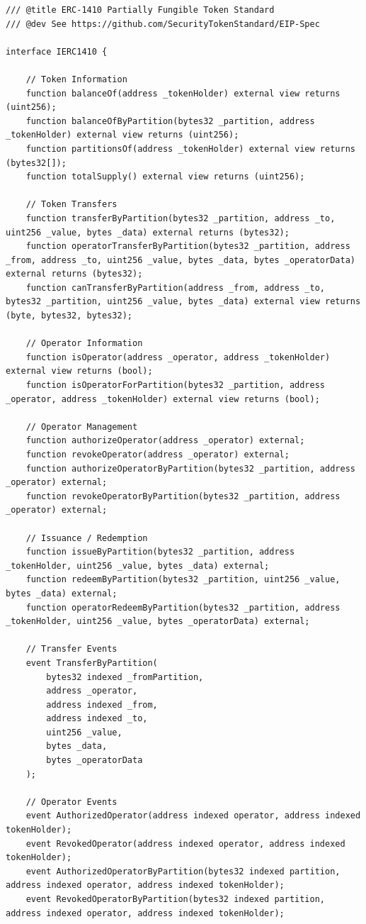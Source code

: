 \begin{lstlisting}[language=Solidity,numbers=none]
/// @title ERC-1410 Partially Fungible Token Standard
/// @dev See https://github.com/SecurityTokenStandard/EIP-Spec

interface IERC1410 {

    // Token Information
    function balanceOf(address _tokenHolder) external view returns (uint256);
    function balanceOfByPartition(bytes32 _partition, address _tokenHolder) external view returns (uint256);
    function partitionsOf(address _tokenHolder) external view returns (bytes32[]);
    function totalSupply() external view returns (uint256);

    // Token Transfers
    function transferByPartition(bytes32 _partition, address _to, uint256 _value, bytes _data) external returns (bytes32);
    function operatorTransferByPartition(bytes32 _partition, address _from, address _to, uint256 _value, bytes _data, bytes _operatorData) external returns (bytes32);
    function canTransferByPartition(address _from, address _to, bytes32 _partition, uint256 _value, bytes _data) external view returns (byte, bytes32, bytes32);    

    // Operator Information
    function isOperator(address _operator, address _tokenHolder) external view returns (bool);
    function isOperatorForPartition(bytes32 _partition, address _operator, address _tokenHolder) external view returns (bool);

    // Operator Management
    function authorizeOperator(address _operator) external;
    function revokeOperator(address _operator) external;
    function authorizeOperatorByPartition(bytes32 _partition, address _operator) external;
    function revokeOperatorByPartition(bytes32 _partition, address _operator) external;

    // Issuance / Redemption
    function issueByPartition(bytes32 _partition, address _tokenHolder, uint256 _value, bytes _data) external;
    function redeemByPartition(bytes32 _partition, uint256 _value, bytes _data) external;
    function operatorRedeemByPartition(bytes32 _partition, address _tokenHolder, uint256 _value, bytes _operatorData) external;

    // Transfer Events
    event TransferByPartition(
        bytes32 indexed _fromPartition,
        address _operator,
        address indexed _from,
        address indexed _to,
        uint256 _value,
        bytes _data,
        bytes _operatorData
    );

    // Operator Events
    event AuthorizedOperator(address indexed operator, address indexed tokenHolder);
    event RevokedOperator(address indexed operator, address indexed tokenHolder);
    event AuthorizedOperatorByPartition(bytes32 indexed partition, address indexed operator, address indexed tokenHolder);
    event RevokedOperatorByPartition(bytes32 indexed partition, address indexed operator, address indexed tokenHolder);


\end{lstlisting}
